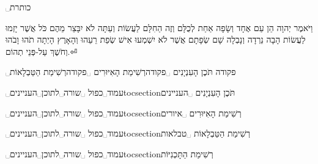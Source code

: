 ␣כותרת



\hfill

\begin{minipage}[l]{0.34688\textwidth}
וַיֹּאמֶר יְהוָה הֵן עַם אֶחָד וְשָׂפָה אַחַת לְכֻלָּם וְזֶה הַחִלָּם
לַעֲשׂוֹת וְעַתָּה לֹא יִבָּצֵר מֵהֶם כֹּל אֲשֶׁר יָזְמוּ לַעֲשׂוֹת
הָבָה נֵרְדָה וְנָבְלָה שָׁם שְׂפָתָם אֲשֶׁר לֹא יִשְׁמְעוּ אִישׁ שְׂפַת
רֵעֵהוּ וְהָאָרֶץ הָיְתָה תֹהוּ וָבֹהוּ וְחֹשֶׁךְ עַל-פְּנֵי תְהוֹם.⏎
\end{minipage}



␣פקודה\contentsname{
  תֹּכֶן הָעִנְיָנִים
}
␣פקודה\listfigurename{רְשִׁימַת הָאִיּוּרִים}
␣פקודה\listtablename{רְשִׁימַת הַטַּבְלָאוֹת}  

␣עמוד␣כפול
␣שורה␣לתוכן␣העניינים{toc}{section}{תֹּכֶן הָעִנְיָנִים}
{}␣העניינים

␣עמוד␣כפול
␣שורה␣לתוכן␣העניינים{toc}{section}{רְשִׁימַת הָאִיּוּרִים}
␣איורים

␣עמוד␣כפול
␣שורה␣לתוכן␣העניינים{toc}{section}{רְשִׁימַת הַטַּבְלָאוֹת}
␣טבלאות

␣עמוד␣כפול
␣שורה␣לתוכן␣העניינים{toc}{section}{רְשִׁימַת הַתָּכְנִיּוֹת}



